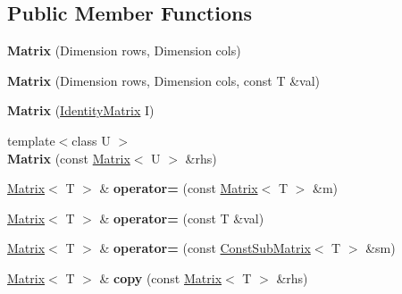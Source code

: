 \subsection*{Public Member Functions}
\begin{DoxyCompactItemize}
\item 
\mbox{\label{classTLAS_1_1Matrix_ae2745879c11247b9bf4cf2858acc8ca4}} 
{\bfseries Matrix} (Dimension rows, Dimension cols)
\item 
\mbox{\label{classTLAS_1_1Matrix_a71aedbd256ec0b12170eed49e1cba74e}} 
{\bfseries Matrix} (Dimension rows, Dimension cols, const T \&val)
\item 
\mbox{\label{classTLAS_1_1Matrix_a4d24d8b9523e6229e4d1f7b137f4b4a0}} 
{\bfseries Matrix} (\hyperlink{structTLAS_1_1IdentityMatrix}{Identity\+Matrix} I)
\item 
\mbox{\label{classTLAS_1_1Matrix_adcf9257fc883fe33c3b7926501da1292}} 
{\footnotesize template$<$class U $>$ }\\{\bfseries Matrix} (const \hyperlink{classTLAS_1_1Matrix}{Matrix}$<$ U $>$ \&rhs)
\item 
\mbox{\label{classTLAS_1_1Matrix_a3f2804344339a18930d13bcbb4ee5fa7}} 
\hyperlink{classTLAS_1_1Matrix}{Matrix}$<$ T $>$ \& {\bfseries operator=} (const \hyperlink{classTLAS_1_1Matrix}{Matrix}$<$ T $>$ \&m)
\item 
\mbox{\label{classTLAS_1_1Matrix_ac97db92c42cce3785407a0d492e94df4}} 
\hyperlink{classTLAS_1_1Matrix}{Matrix}$<$ T $>$ \& {\bfseries operator=} (const T \&val)
\item 
\mbox{\label{classTLAS_1_1Matrix_a9a7ca068e3d96880c07e78f73fbde2c9}} 
\hyperlink{classTLAS_1_1Matrix}{Matrix}$<$ T $>$ \& {\bfseries operator=} (const \hyperlink{classTLAS_1_1ConstSubMatrix}{Const\+Sub\+Matrix}$<$ T $>$ \&sm)
\item 
\mbox{\label{classTLAS_1_1Matrix_acbfbddde8efde1bbe3d64dd980fb6efe}} 
\hyperlink{classTLAS_1_1Matrix}{Matrix}$<$ T $>$ \& {\bfseries copy} (const \hyperlink{classTLAS_1_1Matrix}{Matrix}$<$ T $>$ \&rhs)

\end{DoxyCompactItemize}

